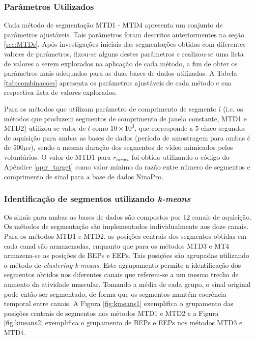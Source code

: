 				\subsubsection{Parâmetros Utilizados}
Cada método de segmentação MTD1 - MTD4 apresenta um conjunto de parâmetros ajustáveis. Tais parâmetros foram descritos anteriormentes na seção \ref{sec:MTDs}. Após investigações iniciais das segmentações obtidas com diferentes valores de parâmetros, fixou-se alguns destes parâmetros e realizou-se uma lista de valores a serem explorados na aplicação de cada método, a fim de obter os parâmetros mais adequados para as duas bases de dados utilizadas. A Tabela \ref{tab:combinacoes} apresenta os parâmetros ajustáveis de cada método e sua respectiva lista de valores explorados.



Para os métodos que utilizam parâmetro de comprimento de segmento $l$ (i.e. os métodos que produzem segmentos de comprimento de janela constante, MTD1 e MTD2) utilizou-se valor de $l$ como $10 \times 10^3$, que corresponde a 5 cinco segundos de aquisição para ambas as bases de dados (período de amostragem para ambas é de $500 \mu s$), sendo a mesma duração dos segmentos de vídeo mimicados pelos voluntários. O valor de MTD1 para $r_{target}$ foi obtido utilizando o código do Apêndice \ref{ap:r_target} como valor mínimo da razão entre número de segmentos e comprimento de sinal para a base de dados NinaPro.

				\subsubsection{Identificação de segmentos utilizando \emph{k-means}}
Os sinais para ambas as bases de dados são compostos por 12 canais de aquisição. Os métodos de segmentação são implementados individualmente aos doze canais. Para os métodos MTD1 e MTD2, as posições centrais dos segmentos obtidas em cada canal são armazenadas, enquanto que para os métodos MTD3 e MT4 armazena-se as posições de BEPs e EEPs. Tais posições são agrupadas utilizando o método de \emph{clustering k-means}. Este agrupamento permite a identificação dos segmentos obtidos nos diferentes canais que referem-se a um mesmo trecho de aumento da atividade muscular. Tomando a média de cada grupo, o sinal original pode então ser segmentado, de forma que os segmentos mantém coerência temporal entre canais. A Figura \ref{fig:kmeans1} exemplifica o grupamento das posições centrais de segmentos nos métodos MTD1 e MTD2 e a Figura \ref{fig:kmeans2} exemplifica o grupamento de BEPs e EEPs nos métodos MTD3 e MTD4.

